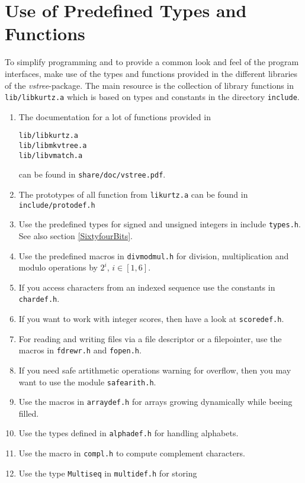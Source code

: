 \documentclass[12pt]{article}
\begin{document}
\section{Use of Predefined Types and Functions}
To simplify programming and to provide a common look and feel of
the program interfaces, make use of the types and functions
provided in the different libraries of the \emph{vstree}-package. The 
main resource is the collection of library functions in \texttt{lib/libkurtz.a}
which is based on types and constants in the directory
\texttt{include}.
\begin{enumerate}
\item
The documentation for a lot of functions provided in 
\begin{small}
\begin{verbatim}
lib/libkurtz.a
lib/libmkvtree.a
lib/libvmatch.a
\end{verbatim}
\end{small}
can be found in \texttt{share/doc/vstree.pdf}.
\item
The prototypes of all function from \texttt{likurtz.a} can be found in 
\texttt{include/protodef.h}
\item
Use the predefined types for signed and unsigned integers in
include \texttt{types.h}. See also section \ref{SixtyfourBits}.
\item
Use the predefined macros in \texttt{divmodmul.h} for division,
multiplication and modulo operations by \(2^{i}\), \(i\in[1,6]\).
\item
If you access characters from an indexed sequence use the constants
in \texttt{chardef.h}.
\item
If you want to work with integer scores, then have a look
at \texttt{scoredef.h}.
\item
For reading and writing files via a file descriptor or a 
filepointer, use the macros in \texttt{fdrewr.h} and \texttt{fopen.h}.
\item
If you need safe artithmetic operations warning for overflow, then
you may want to use the module \texttt{safearith.h}.
\item
Use the macros in \texttt{arraydef.h} for arrays growing dynamically
while beeing filled.
\item
Use the types defined in \texttt{alphadef.h} for handling
alphabets.
\item
Use the macro in \texttt{compl.h} to compute complement characters.
\item
Use the type \texttt{Multiseq} in \texttt{multidef.h} for storing

\end{enumerate}
\end{document}
